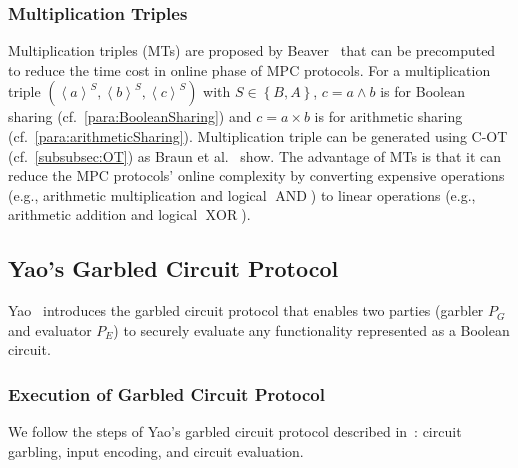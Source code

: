 \subsubsection{Multiplication Triples}
\label{subsubsec:MTs}
Multiplication triples (MTs) are proposed by Beaver~\cite{beaver1991efficient} that can be precomputed to reduce the time cost in online phase of MPC protocols.
For a multiplication triple $\left(\left\langle a\right\rangle^S , \left\langle b\right\rangle^S,\left\langle c\right\rangle^S\right) $ with $S\in \left\{B,A\right\} $, $c=a\land b$ is for Boolean sharing (cf.~\autoref{para:BooleanSharing}) and $c=a \times  b$ is for arithmetic sharing (cf.~\autoref{para:arithmeticSharing}).
Multiplication triple can be generated using C-OT (cf.~\autoref{subsubsec:OT}) as Braun et al.~\cite{DSZ15,braun2020motion} show. The advantage of MTs is that it can reduce the MPC protocols' online complexity by converting expensive operations (e.g., arithmetic multiplication and logical $\operatorname{AND}$) to linear operations (e.g., arithmetic addition and logical $\operatorname{XOR}$).


\subsection{Yao's Garbled Circuit Protocol}
\label{subsec:YaoGarbledCircuitProtocol}
Yao~\cite{Yao86} introduces the garbled circuit protocol that enables two parties (garbler $P_G$ and evaluator $P_E$) to securely evaluate any functionality represented as a Boolean circuit.


\subsubsection{Execution of Garbled Circuit Protocol}
We follow the steps of Yao's garbled circuit protocol described in~\cite{lindell2009proof}: circuit garbling, input encoding, and circuit evaluation.

